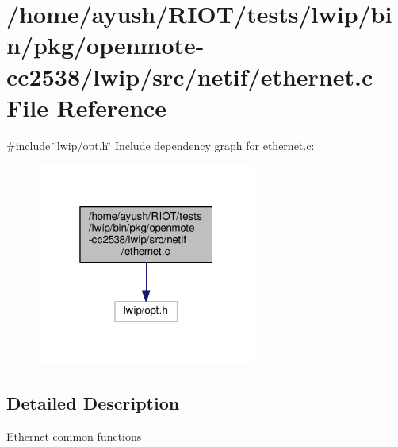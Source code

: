 \hypertarget{openmote-cc2538_2lwip_2src_2netif_2ethernet_8c}{}\section{/home/ayush/\+R\+I\+O\+T/tests/lwip/bin/pkg/openmote-\/cc2538/lwip/src/netif/ethernet.c File Reference}
\label{openmote-cc2538_2lwip_2src_2netif_2ethernet_8c}
{\ttfamily \#include \char`\"{}lwip/opt.\+h\char`\"{}}\newline
Include dependency graph for ethernet.\+c\+:
\nopagebreak
\begin{figure}[H]
\begin{center}
\leavevmode
\includegraphics[width=205pt]{openmote-cc2538_2lwip_2src_2netif_2ethernet_8c__incl}
\end{center}
\end{figure}


\subsection{Detailed Description}
Ethernet common functions 